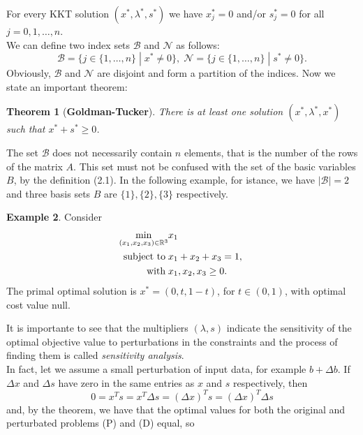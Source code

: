 \documentclass[a4paper,10 pt,titlepage,twoside]{book}
\theoremstyle{plain}
\newtheorem{thm}{Theorem}[chapter]
\theoremstyle{definition}
\newtheorem{ex}[thm]{Example}
\theoremstyle{remark}
\begin{document}
For every KKT solution $(x^{*}, \lambda^{*}, s^{*})$ we have $x_{j}^{*}= 0$ and/or $s_{j}^{*}= 0$ for all $j=0,1,\dots,n$.\\
We can define two index sets $\mathcal{B}$ and $\mathcal{N}$ as follows:
\begin{equation}\label{index}
\mathcal{B} =\{j\in\{1,\dots,n\}\;|\; x^{*} \not= 0\}, \;
\mathcal{N} =\{j\in\{1,\dots,n\}\;|\; s^{*} \not= 0\}.
\end{equation}  
Obviously, $\mathcal{B}$ and $\mathcal{N}$ are disjoint and form a partition of the indices. Now we state an important theorem:
\begin{thm}[\textbf{Goldman-Tucker}]
	There is at least one solution $(x^{*}, \lambda^{*}, x^{*})$ such that $x^{*}+s^{*}\geq0$.
\end{thm}
The set $\mathcal{B}$ does not necessarily contain $n$ elements, that is the number of the rows of the matrix $A$. This set must not be confused with the set of the basic variables $B$, by the definition (2.1). In the following example, for istance, we have $|\mathcal{B}|= 2$ and three basis sets $B$ are $\{1\}, \{2\}, \{3\}$ respectively.
\begin{ex}
Consider
\begin{align*} \min\limits_{(x_{1},x_{2},x_{3})\in\mathbb{R}^{3}} &x_{1}\\ \text{\;subject to\;} &x_{1}+x_{2}+x_{3} = 1,\; \\
 \text{\; with\;} &x_{1}, x_{2}, x_{3} \geq 0.
 \end{align*}
The primal optimal solution is $x^{*}=(0, t, 1-t)$, for $t\in(0,1)$, with optimal cost value null. 	
\end{ex} 

It is importante to see that the multipliers $(\lambda,s)$ indicate the sensitivity of the optimal objective value to perturbations in the constraints and the process of finding them is called \textit{sensitivity analysis}. \\ In fact, let we assume a small perturbation of input data, for example $b + \Delta b$. If $\Delta x$ and $\Delta s$ have zero in the same entries as $x$ and $s$ respectively, then
\begin{equation*}
0=x^{T}s=x^{T}\Delta s= \left( \Delta x\right)^{T}s=\left( \Delta x\right)^{T}\Delta s
\end{equation*}
and, by the theorem, we have that the optimal values for both the original and perturbated problems (P) and (D) equal, so
\end{document}
